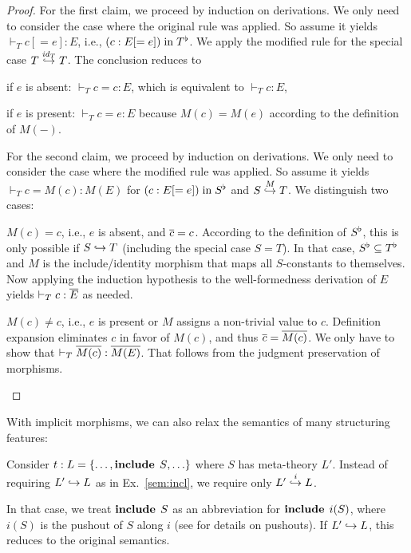 \begin{proof}
For the first claim, we proceed by induction on derivations.
We only need to consider the case where the original rule was applied.
So assume it yields $\vdash_T c[=e]:E$, i.e., $(c:E[=e]) \minn \flt{T}$.
We apply the modified rule for the special case $\ipc{\id{T}}{T}{T}$.
The conclusion reduces to
\begin{compactitem}
 \item if $e$ is absent: $\vdash_T c=c:E$, which is equivalent to $\vdash_T c:E$,
 \item if $e$ is present: $\vdash_T c=e:E$ because $M(c)=M(e)$ according to the definition of $M(-)$.
\end{compactitem}

For the second claim, we proceed by induction on derivations.
We only need to consider the case where the modified rule was applied.
So assume it yields $\vdash_T c=M(c):M(E)$ for $(c:E[=e]) \minn \flt{S}$ and $\ipc{M}{S}{T}$.
We distinguish two cases:
\begin{compactitem}
 \item $M(c)=c$, i.e., $e$ is absent, and $\ov{c}=c$.
   According to the definition of $\flt{S}$, this is only possible if $S\harr T$ (including the special case $S=T$).
   In that case, $\flt{S}\sq\flt{T}$ and $M$ is the include/identity morphism that maps all $S$-constants to themselves.
   Now applying the induction hypothesis to the well-formedness derivation of $E$ yields $\vdash_T c:\ov{E}$ as needed.
 \item $M(c)\neq c$, i.e., $e$ is present or $M$ assigns a non-trivial value to $c$.
  Definition expansion eliminates $c$ in favor of $M(c)$, and thus $\ov{c}=\ov{M(c)}$.
  We only have to show that $\vdash_T \ov{M(c)}:\ov{M(E)}$. That follows from the judgment preservation of morphisms.
\end{compactitem}
\end{proof}


With implicit morphisms, we can also relax the semantics of many structuring features:

\begin{example}\label{impl:incl2}
Consider $t:L=\{\ldots,\icl{S},\ldots\}$ where $S$ has meta-theory $L'$.
Instead of requiring $L'\harr L$ as in Ex.~\ref{sem:incl}, we require only $\ipc{i}{L'}{L}$.

In that case, we treat $\icl{S}$ as an abbreviation for $\icl{i(S)}$, where $i(S)$ is the pushout of $S$ along $i$ (see \cite{rabe:howto} for details on \mmt pushouts).
If $L'\harr L$, this reduces to the original semantics.
\end{example}

